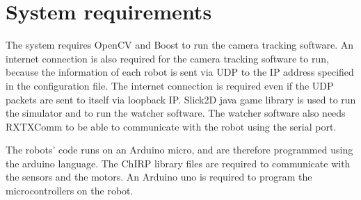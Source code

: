 \chapter{System requirements}

The system requires OpenCV and Boost to run the camera tracking software. An internet connection is also required for the camera tracking software to run, because the information of each robot is sent via UDP to the IP address specified in the configuration file. The internet connection is required even if the UDP packets are sent to itself via loopback IP.
Slick2D java game library is used to run the simulator and to run the watcher software. 
The watcher software also needs RXTXComm to be able to communicate with the robot using the serial port.

The robots' code runs on an Arduino micro, and are therefore programmed using the arduino language. The ChIRP library files are required to communicate with the sensors and the motors. An Arduino uno is required to program the microcontrollers on the robot.